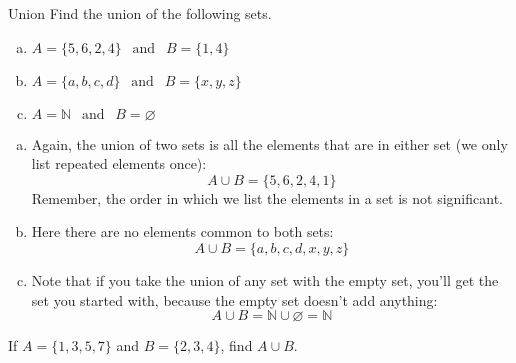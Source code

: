 \begin{example}[https://www.youtube.com/watch?v=9jNZnZEBeqQ&list=PLfmpjsIzhztuvrh-T2Owgo_gO84qypSBG&index=12]{Union}
Find the union of the following sets.
\begin{enumerate}[(a)]
\item $A = \{5,6,2,4\} \ \ \textrm{ and } \ \ B = \{1,4\}$
\item $A = \{a,b,c,d\} \ \ \textrm{ and } \ \ B = \{x,y,z\}$
\item $A = \mathbb{N} \ \ \textrm{ and } \ \ B = \varnothing$
\end{enumerate}

\sol
\begin{enumerate}[(a)]
\item Again, the union of two sets is all the elements that are in either set (we only list repeated elements once):
\[\boxed{A \cup B = \{5,6,2,4,1\}}\]  Remember, the order in which we list the elements in a set is not significant.

\item Here there are no elements common to both sets:
\[\boxed{A \cup B = \{a, b, c, d, x, y, z\}}\]

\item Note that if you take the union of any set with the empty set, you'll get the set you started with, because the empty set doesn't add anything:
\[\boxed{A \cup B = \mathbb{N} \cup \varnothing = \mathbb{N}}\]
\end{enumerate}
\end{example}

\begin{try}
If $A=\{1,3,5,7\}$ and $B=\{2,3,4\}$, find $A \cup B$.
\end{try}
\vfill
\pagebreak

